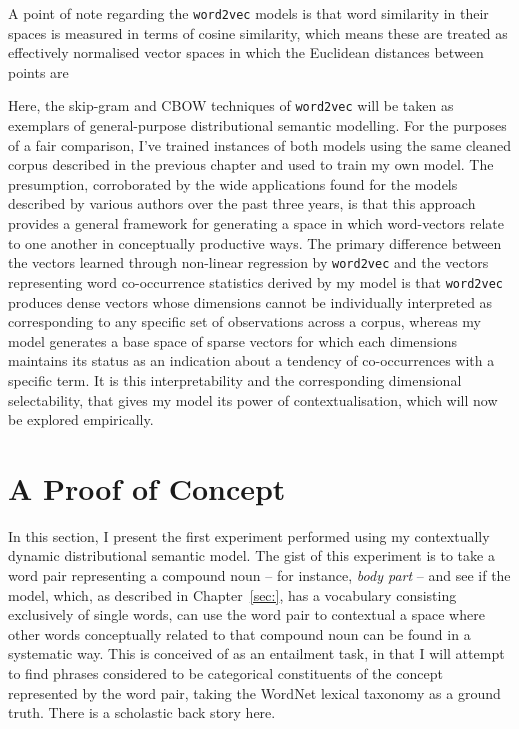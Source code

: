 A point of note regarding the \texttt{word2vec} models is that word similarity in their spaces is measured in terms of cosine similarity, which means these are treated as effectively normalised vector spaces in which the Euclidean distances between points are

Here, the skip-gram and CBOW techniques of \texttt{word2vec} will be taken as exemplars of general-purpose distributional semantic modelling.  For the purposes of a fair comparison, I've trained instances of both models using the same cleaned corpus described in the previous chapter and used to train my own model.  The presumption, corroborated by the wide applications found for the models described by various authors over the past three years, is that this approach provides a general framework for generating a space in which word-vectors relate to one another in conceptually productive ways.  The primary difference between the vectors learned through non-linear regression by \texttt{word2vec} and the vectors representing word co-occurrence statistics derived by my model is that \texttt{word2vec} produces dense vectors whose dimensions cannot be individually interpreted as corresponding to any specific set of observations across a corpus, whereas my model generates a base space of sparse vectors for which each dimensions maintains its status as an indication about a tendency of co-occurrences with a specific term.  It is this interpretability and the corresponding dimensional selectability, that gives my model its power of contextualisation, which will now be explored empirically.

\section{A Proof of Concept}
In this section, I present the first experiment performed using my contextually dynamic distributional semantic model.  The gist of this experiment is to take a word pair representing a compound noun -- for instance, \emph{body part} -- and see if the model, which, as described in Chapter~\ref{sec:}, has a vocabulary consisting exclusively of single words, can use the word pair to contextual a space where other words conceptually related to that compound noun can be found in a systematic way.  This is conceived of as an entailment task, in that I will attempt to find phrases considered to be categorical constituents of the concept represented by the word pair, taking the WordNet lexical taxonomy as a ground truth.  There is a scholastic back story here.

